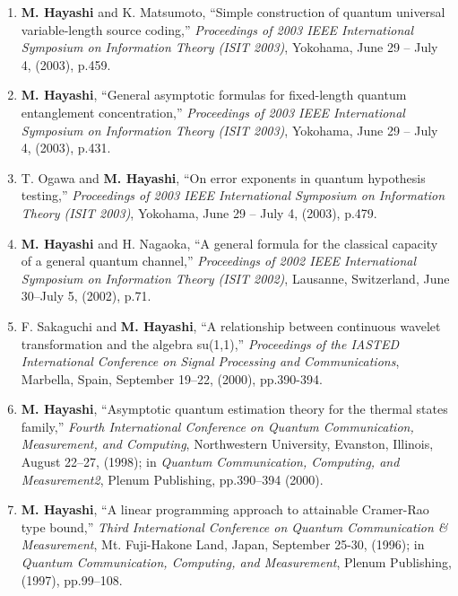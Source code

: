 \documentclass[a4paper,12pt,oneside]{article}
\begin{document}
\begin{enumerate}
    \item
    \textbf{M. Hayashi} and K. Matsumoto, ``Simple construction of quantum universal variable-length source coding,'' 
    {\em Proceedings of 2003 IEEE International Symposium on Information Theory (ISIT 2003)}, 
    Yokohama, June 29 -- July 4, (2003), p.459.
    
    \item
    \textbf{M. Hayashi}, ``General asymptotic formulas for fixed-length quantum entanglement concentration,'' 
    {\em Proceedings of 2003 IEEE International Symposium on Information Theory (ISIT 2003)}, 
    Yokohama, June 29 -- July 4, (2003), p.431.
    
    \item
    T. Ogawa and \textbf{M. Hayashi}, ``On error exponents in quantum hypothesis testing,'' 
    {\em Proceedings of 2003 IEEE International Symposium on Information Theory (ISIT 2003)}, 
    Yokohama, June 29 -- July 4, (2003), p.479.
    
    \item
    \textbf{M. Hayashi} and H. Nagaoka, ``A general formula for the classical capacity of a general quantum channel,'' 
    {\em Proceedings of 2002 IEEE International Symposium on Information Theory (ISIT 2002)}, 
    Lausanne, Switzerland, June 30--July 5, (2002), p.71.
    
    \item
    F. Sakaguchi and \textbf{M. Hayashi}, ``A relationship between continuous wavelet transformation and the algebra su(1,1),'' 
    {\em Proceedings of the IASTED International Conference on Signal Processing and Communications}, Marbella, Spain, September 19--22, (2000), pp.390-394.
    \item
    \textbf{M. Hayashi}, ``Asymptotic quantum estimation theory for the thermal states family,'' 
    {\em Fourth International Conference on 
    Quantum Communication, Measurement, and Computing}, 
    Northwestern University, Evanston, Illinois,  August 22--27, (1998);
    in {\em Quantum Communication, Computing, and Measurement2}, Plenum Publishing, pp.390--394 (2000).
    
    \item
    \textbf{M. Hayashi}, ``A linear programming approach to attainable Cramer-Rao type bound,'' 
    {\em Third International Conference on Quantum Communication \& Measurement}, 
    Mt. Fuji-Hakone Land, Japan, September 25-30, (1996);
    in {\em Quantum Communication, Computing, and Measurement}, Plenum Publishing, (1997), 
    pp.99--108.
\end{enumerate}
\end{document}
